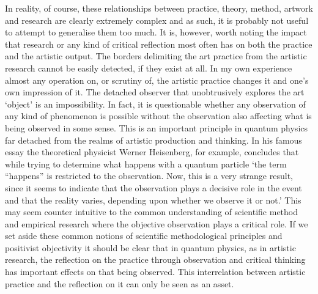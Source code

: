 \documentclass[12pt]{article}
\begin{document}
In reality, of course, these relationships between practice, theory, method, artwork and research are clearly extremely complex and as such, it is probably not useful to attempt to generalise them too much. It is, however, worth noting the impact that research or any kind of critical reflection most often has on both the practice and the artistic output. The borders delimiting the art practice from the artistic research cannot be easily detected, if they exist at all. In my own experience almost any operation on, or scrutiny of, the artistic practice changes it and one's own impression of it. The detached observer that unobtrusively explores the art `object' is an impossibility. In fact, it is questionable whether any observation of any kind of phenomenon is possible without the observation also affecting what is being observed in some sense. This is an important principle in quantum physics far detached from the realms of artistic production and thinking. In his famous essay the theoretical physicist Werner Heisenberg, for example, concludes that while trying to determine what happens with a quantum particle `the term ``happens'' is restricted to the observation. Now, this is a very strange result, since it seems to indicate that the observation plays a decisive role in the event and that the reality varies, depending upon whether we observe it or not.' This may seem counter intuitive to the common understanding of scientific method and empirical research where the objective observation plays a critical role. If we set aside these common notions of scientific methodological principles and positivist objectivity it should be clear that in quantum physics, as in artistic research, the reflection on the practice through observation and critical thinking has important effects on that being observed. This interrelation between artistic practice and the reflection on it can only be seen as an asset.


\end{document}
